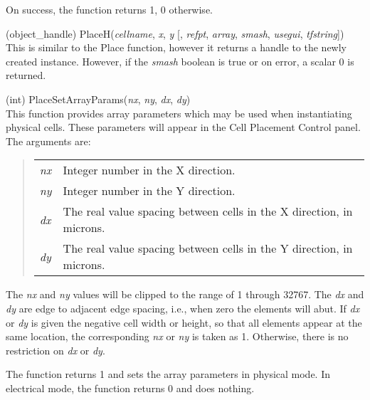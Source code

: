 \begin{description}
On success, the function returns 1, 0 otherwise.

\item{(object\_handle) \vt PlaceH({\it cellname\/}, {\it x\/}, {\it y\/}
  [, {\it refpt\/}, {\it array\/}, {\it smash\/}, {\it usegui\/},
  {\it tfstring\/}])}\\
This is similar to the {\vt Place} function, however it returns a
handle to the newly created instance.  However, if the {\it smash}
boolean is true or on error, a scalar 0 is returned.

\item{(int) \vt PlaceSetArrayParams({\it nx\/}, {\it ny\/}, {\it dx\/},
{\it dy\/})}\\
This function provides array parameters which may be used when
instantiating physical cells.  These parameters will appear in the
{\cb Cell Placement Control} panel.  The arguments are:
  
\begin{quote}
\begin{tabular}{ll}
{\it nx\/} & Integer number in the X direction.\\
{\it ny\/} & Integer number in the Y direction.\\
{\it dx\/} & The real value spacing between cells in
  the X direction, in microns.\\
{\it dy\/} & The real value spacing between cells in
  the Y direction, in microns.\\
\end{tabular}
\end{quote}
  
The {\it nx} and {\it ny} values will be clipped to the range of 1
through 32767.  The {\it dx} and {\it dy} are edge to adjacent edge
spacing, i.e., when zero the elements will abut.  If {\it dx} or {\it
dy} is given the negative cell width or height, so that all elements
appear at the same location, the corresponding {\it nx} or {\it ny} is
taken as 1.  Otherwise, there is no restriction on {\it dx} or {\it
dy}.

The function returns 1 and sets the array parameters in physical mode. 
In electrical mode, the function returns 0 and does nothing.


\end{description}
